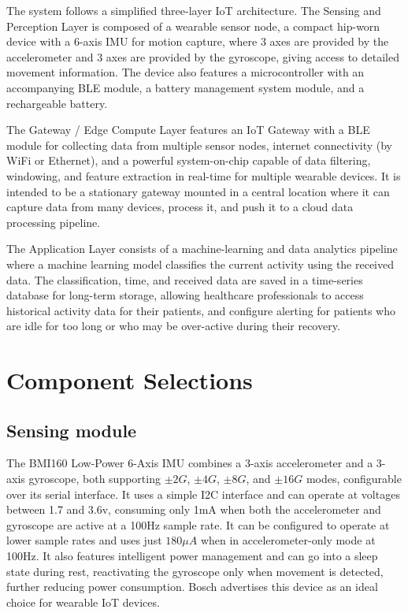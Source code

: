 \documentclass[conference]{IEEEtran}
\begin{document}
The system follows a simplified three-layer IoT architecture. The Sensing and Perception Layer is composed of a wearable sensor node, a compact hip-worn device with a 6-axis IMU for motion capture, where 3 axes are provided by the accelerometer and 3 axes are provided by the gyroscope, giving access to detailed movement information. The device also features a microcontroller with an accompanying BLE module, a battery management system module, and a rechargeable battery.

The Gateway / Edge Compute Layer features an IoT Gateway with a BLE module for collecting data from multiple sensor nodes, internet connectivity (by WiFi or Ethernet), and a powerful system-on-chip capable of data filtering, windowing, and feature extraction in real-time for multiple wearable devices. It is intended to be a stationary gateway mounted in a central location where it can capture data from many devices, process it, and push it to a cloud data processing pipeline.

The Application Layer consists of a machine-learning and data analytics pipeline where a machine learning model classifies the current activity using the received data. The classification, time, and received data are saved in a time-series database for long-term storage, allowing healthcare professionals to access historical activity data for their patients, and configure alerting for patients who are idle for too long or who may be over-active during their recovery.

\section{Component Selections}\label{components}

\subsection{Sensing module}
The BMI160 Low-Power 6-Axis IMU\cite{BMI160} combines a 3-axis accelerometer and a 3-axis gyroscope, both supporting $\pm2G$, $\pm4G$, $\pm8G$, and $\pm16G$ modes, configurable over its serial interface. It uses a simple I2C interface and can operate at voltages between 1.7 and 3.6v, consuming only 1mA when both the accelerometer and gyroscope are active at a 100Hz sample rate. It can be configured to operate at lower sample rates and uses just $180\mu A$ when in accelerometer-only mode at 100Hz. It also features intelligent power management and can go into a sleep state during rest, reactivating the gyroscope only when movement is detected, further reducing power consumption. Bosch advertises this device as an ideal choice for wearable IoT devices.
\end{document}
